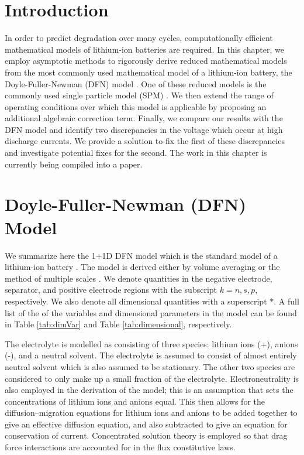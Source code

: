 \documentclass[preprint]{elsarticle}
\begin{document}
\section{Introduction} 
In order to predict degradation over many cycles, computationally efficient mathematical models of lithium-ion batteries are required. In this chapter, we employ asymptotic methods to rigorously derive reduced mathematical models from the most commonly used mathematical model of a lithium-ion battery, the Doyle-Fuller-Newman (DFN) model \cite{doyle,Fuller1994,newman_book}. One of these reduced models is the commonly used single particle model (SPM) \cite{Bizeray2017,Perez2016}. We then extend the range of operating conditions over which this model is applicable by proposing an additional algebraic correction term. Finally, we compare our results with the DFN model and identify two discrepancies in the voltage which occur at high discharge currents. We provide a solution to fix the first of these discrepancies and investigate potential fixes for the second. The work in this chapter is currently being compiled into a paper. 

\section{Doyle-Fuller-Newman (DFN) Model}
We summarize here the 1+1D DFN model which is the standard model of a lithium-ion battery \cite{doyle,Fuller1994,newman_book}. The model is derived either by volume averaging \cite{newman_book} or the method of multiple scales \cite{Richardson2011}. We denote quantities in the negative electrode, separator, and positive electrode regions with the subscript $k=n,s,p$, respectively. We also denote all dimensional quantities with a superscript $*$. A full list of the of the variables and dimensional parameters in the model can be found in Table \ref{tab:dimVar} and Table \ref{tab:dimensional}, respectively. 

The electrolyte is modelled as consisting of three species: lithium ions (+), anions (-), and a neutral solvent. The electrolyte is assumed to consist of almost entirely neutral solvent which is also assumed to be stationary. The other two species are considered to only make up a small fraction of the electrolyte. Electroneutrality is also employed in the derivation of the model; this is an assumption that sets the concentrations of lithium ions and anions equal. This then allows for the diffusion--migration equations for lithium ions and anions to be added together to give an effective diffusion equation, and also subtracted to give an equation for conservation of current. Concentrated solution theory is employed so that drag force interactions are accounted for in the flux constitutive laws. \\ 
\end{document}
